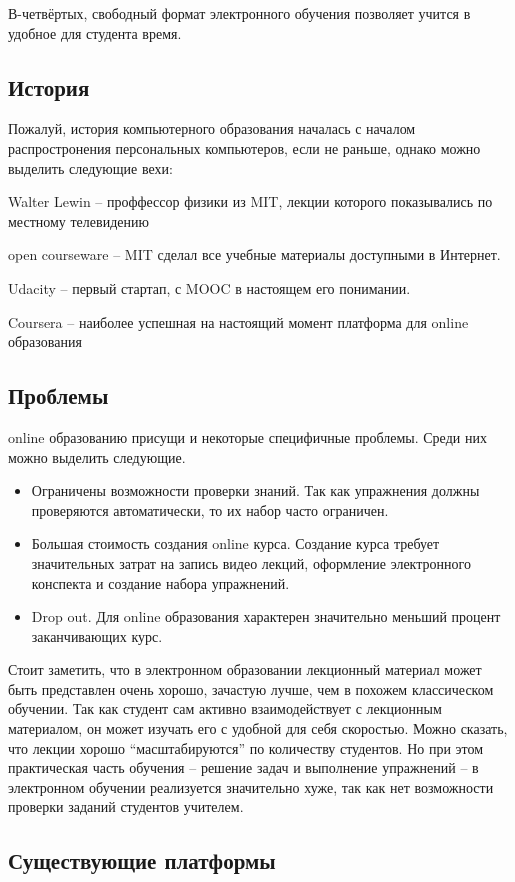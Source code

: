 \documentclass{matmex-diploma-custom}
\begin{document}
В-четвёртых, свободный формат электронного обучения позволяет учится в
удобное для студента время.

\subsection*{История}
Пожалуй, история компьютерного образования началась с началом
распростронения персональных компьютеров, если не раньше, однако можно
выделить следующие вехи:

Walter Lewin -- проффессор физики из MIT, лекции которого показывались
по местному телевидению

open courseware -- MIT сделал все учебные материалы доступными в Интернет.

Udacity -- первый стартап, с MOOC в настоящем его понимании.

Coursera -- наиболее успешная на настоящий момент платформа для online
образования

\subsection*{Проблемы}
online образованию присущи и некоторые специфичные проблемы. Среди них
можно выделить следующие.
\begin{itemize}
\item Ограничены возможности проверки знаний.  Так как упражнения
  должны проверяются автоматически, то их набор часто ограничен.
\item Большая стоимость создания online курса.  Создание курса требует
  значительных затрат на запись видео лекций, оформление электронного
  конспекта и создание набора упражнений.
\item Drop out. Для online образования характерен значительно меньший
  процент заканчивающих курс.
\end{itemize}

Стоит заметить, что в электронном образовании лекционный материал
может быть представлен очень хорошо, зачастую лучше, чем в похожем
классическом обучении. Так как студент сам активно взаимодействует с
лекционным материалом, он может изучать его с удобной для себя
скоростью. Можно сказать, что лекции хорошо ``масштабируются'' по
количеству студентов. Но при этом практическая часть обучения --
решение задач и выполнение упражнений -- в электронном обучении
реализуется значительно хуже, так как нет возможности проверки заданий
студентов учителем.

\subsection*{Существующие платформы}
\end{document}
